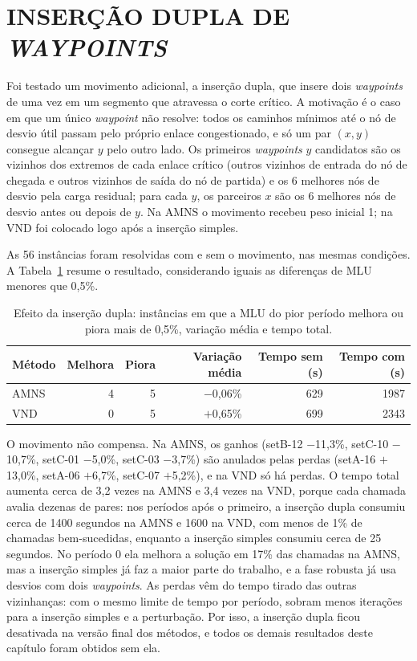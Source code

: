 \section{\uppercase{Inserção Dupla de \textit{Waypoints}}}
\label{sec:insercao_dupla}

Foi testado um movimento adicional, a inserção dupla, que insere dois \textit{waypoints} de uma vez em um segmento que atravessa o corte crítico. A motivação é o caso em que um único \textit{waypoint} não resolve: todos os caminhos mínimos até o nó de desvio útil passam pelo próprio enlace congestionado, e só um par $(x, y)$ consegue alcançar $y$ pelo outro lado. Os primeiros \textit{waypoints} $y$ candidatos são os vizinhos dos extremos de cada enlace crítico (outros vizinhos de entrada do nó de chegada e outros vizinhos de saída do nó de partida) e os 6 melhores nós de desvio pela carga residual; para cada $y$, os parceiros $x$ são os 6 melhores nós de desvio antes ou depois de $y$. Na AMNS o movimento recebeu peso inicial 1; na VND foi colocado logo após a inserção simples.

As 56 instâncias foram resolvidas com e sem o movimento, nas mesmas condições. A Tabela~\ref{tab:insercao_dupla} resume o resultado, considerando iguais as diferenças de MLU menores que 0,5\%.

\begin{table}[H]
\centering
\caption{Efeito da inserção dupla: instâncias em que a MLU do pior período melhora ou piora mais de 0,5\%, variação média e tempo total.}
\label{tab:insercao_dupla}
\begin{tabular}{lrrrrr}
\toprule
Método & Melhora & Piora & Variação média & Tempo sem (s) & Tempo com (s) \\
\midrule
AMNS & 4 & 5 & $-$0{,}06\% & 629 & 1987 \\
VND & 0 & 5 & $+$0{,}65\% & 699 & 2343 \\
\bottomrule
\end{tabular}
\end{table}

O movimento não compensa. Na AMNS, os ganhos (setB-12 $-$11,3\%, setC-10 $-$10,7\%, setC-01 $-$5,0\%, setC-03 $-$3,7\%) são anulados pelas perdas (setA-16 $+$13,0\%, setA-06 $+$6,7\%, setC-07 $+$5,2\%), e na VND só há perdas. O tempo total aumenta cerca de 3,2 vezes na AMNS e 3,4 vezes na VND, porque cada chamada avalia dezenas de pares: nos períodos após o primeiro, a inserção dupla consumiu cerca de 1400 segundos na AMNS e 1600 na VND, com menos de 1\% de chamadas bem-sucedidas, enquanto a inserção simples consumiu cerca de 25 segundos. No período 0 ela melhora a solução em 17\% das chamadas na AMNS, mas a inserção simples já faz a maior parte do trabalho, e a fase robusta já usa desvios com dois \textit{waypoints}. As perdas vêm do tempo tirado das outras vizinhanças: com o mesmo limite de tempo por período, sobram menos iterações para a inserção simples e a perturbação. Por isso, a inserção dupla ficou desativada na versão final dos métodos, e todos os demais resultados deste capítulo foram obtidos sem ela.


